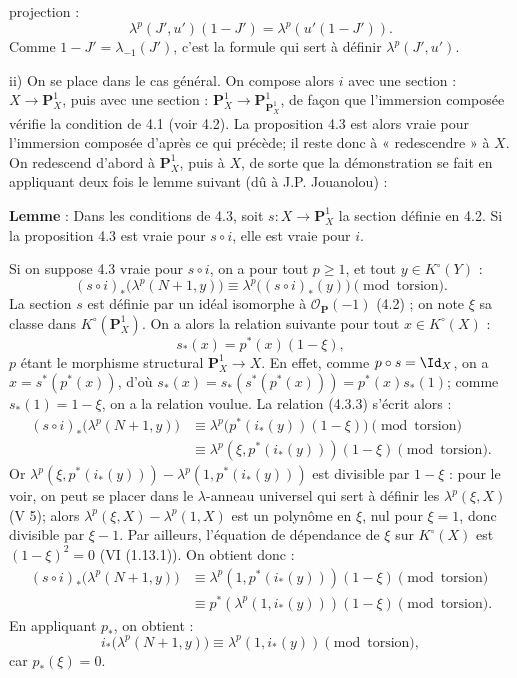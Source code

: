 projection :
\[
  \lambda^p(J',u')(1-J')=\lambda^p(u'(1-J')).
\]
Comme \(1-J'=\lambda_{-1}(J')\), c'est la formule qui sert à définir \(\lambda^p(J',u')\).

ii) On se place dans le cas général. On compose alors \(i\) avec une section : \(X\to\mathbf P_X^1\), puis avec une section : \(\mathbf P_X^1\to\mathbf P_{\mathbf P_X^1}^1\), de façon que l'immersion composée vérifie la condition de 4.1 (voir 4.2). La proposition 4.3 est alors vraie pour l'immersion composée d'après ce qui précède; il reste donc à « redescendre » à \(X\). On redescend d'abord à \(\mathbf P_X^1\), puis à \(X\), de sorte que la démonstration se fait en appliquant deux fois le lemme suivant (dû à J.P. Jouanolou) :

\textbf{Lemme} : Dans les conditions de 4.3, soit \(s:X\to\mathbf P_X^1\) la section définie en 4.2. Si la proposition 4.3 est vraie pour \(s\circ i\), elle est vraie pour \(i\).

Si on suppose 4.3 vraie pour \(s\circ i\), on a pour tout \(p\ge1\), et tout \(y\in K^\circ(Y)\) :
\begin{equation}\tag{4.3.3}
 (s\circ i)_*\bigl(\lambda^p(N+1,y)\bigr)
 \equiv
 \lambda^p\bigl((s\circ i)_*(y)\bigr)
 \pmod{\text{torsion}}.
\end{equation}
La section \(s\) est définie par un idéal isomorphe à \(\mathcal O_{\mathbf P}(-1)\) (4.2) ; on note \(\xi\) sa classe dans \(K^\circ(\mathbf P_X^1)\). On a alors la relation suivante pour tout \(x\in K^\circ(X)\) :
\[
  s_*(x)=p^*(x)(1-\xi),
\]
\(p\) étant le morphisme structural \(\mathbf P_X^1\to X\). En effet, comme \(p\circ s=\Id_X\), on a \(x=s^*(p^*(x))\), d'où \(s_*(x)=s_*(s^*(p^*(x)))=p^*(x)s_*(1)\); comme \(s_*(1)=1-\xi\), on a la relation voulue. La relation (4.3.3) s'écrit alors :
\[
\begin{aligned}
(s\circ i)_*\bigl(\lambda^p(N+1,y)\bigr)
&\equiv \lambda^p\bigl(p^*(i_*(y))(1-\xi)\bigr)\pmod{\text{torsion}}\\
&\equiv \lambda^p(\xi,p^*(i_*(y)))(1-\xi)\pmod{\text{torsion}}.
\end{aligned}
\]
Or \(\lambda^p(\xi,p^*(i_*(y)))-\lambda^p(1,p^*(i_*(y)))\) est divisible par \(1-\xi\) :
pour le voir, on peut se placer dans le \(\lambda\)-anneau universel qui sert à définir les \(\lambda^p(\xi,X)\) (V 5); alors \(\lambda^p(\xi,X)-\lambda^p(1,X)\) est un polynôme en \(\xi\), nul pour \(\xi=1\), donc divisible par \(\xi-1\). Par ailleurs, l'équation de dépendance de \(\xi\) sur \(K^\circ(X)\) est \((1-\xi)^2=0\) (VI (1.13.1)). On obtient donc :
\[
\begin{aligned}
(s\circ i)_*\bigl(\lambda^p(N+1,y)\bigr)
&\equiv \lambda^p(1,p^*(i_*(y)))(1-\xi) \pmod{\text{torsion}}\\
&\equiv p^*(\lambda^p(1,i_*(y)))(1-\xi) \pmod{\text{torsion}}.
\end{aligned}
\]
En appliquant \(p_*\), on obtient :
\begin{equation}\tag{4.3.4}
  i_*\bigl(\lambda^p(N+1,y)\bigr)
  \equiv \lambda^p(1,i_*(y)) \pmod{\text{torsion}},
\end{equation}
car \(p_*(\xi)=0\).

